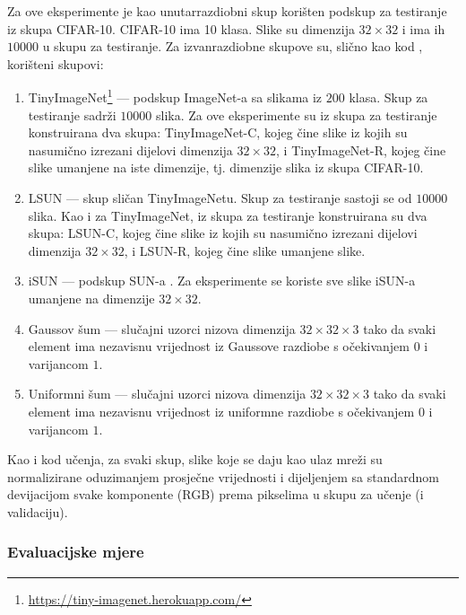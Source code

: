 \documentclass[utf8, diplomski, lmodern]{fer}
\begin{document}
Za ove eksperimente je kao unutarrazdiobni skup korišten podskup za testiranje iz skupa CIFAR-10. CIFAR-10 ima 10 klasa. Slike su dimenzija $32\times 32$ i ima ih $10000$ u skupu za testiranje. Za izvanrazdiobne skupove su, slično kao kod \cite{Hendrycks:2016:BDMOODE,Liang:2017:PDOODENN}, korišteni skupovi:
\begin{enumerate}[topsep=0pt,itemsep=0pt,partopsep=0pt]
	\item TinyImageNet\footnote{\url{https://tiny-imagenet.herokuapp.com/}} --- podskup ImageNet-a \citep{Deng:2009:ILSHID} sa slikama iz $200$ klasa. Skup za testiranje sadrži $10000$ slika. Za ove eksperimente su iz skupa za testiranje konstruirana dva skupa: TinyImageNet-C, kojeg čine slike iz kojih su nasumično izrezani dijelovi dimenzija $32\times 32$, i TinyImageNet-R, kojeg čine slike umanjene na iste dimenzije, tj. dimenzije slika iz skupa CIFAR-10.
	\item LSUN \citep{Yu:2015:LSUN} --- skup sličan TinyImageNetu. Skup za testiranje sastoji se od $10000$ slika. Kao i za TinyImageNet, iz skupa za testiranje konstruirana su dva skupa: LSUN-C, kojeg čine slike iz kojih su nasumično izrezani dijelovi dimenzija $32\times 32$, i LSUN-R, kojeg čine slike umanjene slike.
	\item iSUN \citep{Xu:2015:TCSWBET} --- podskup SUN-a \citep{Xiao:2016:SUN}. Za eksperimente se koriste sve slike iSUN-a umanjene na dimenzije $32\times 32$.
	\item Gaussov šum --- slučajni uzorci nizova dimenzija $32\times 32\times 3$ tako da svaki element ima nezavisnu vrijednost iz Gaussove razdiobe s očekivanjem $0$ i varijancom $1$.
	\item Uniformni šum --- slučajni uzorci nizova dimenzija $32\times 32\times 3$ tako da svaki element ima nezavisnu vrijednost iz uniformne razdiobe s očekivanjem $0$ i varijancom $1$.
\end{enumerate}
Kao i kod učenja, za svaki skup, slike koje se daju kao ulaz mreži su normalizirane oduzimanjem prosječne vrijednosti i dijeljenjem sa standardnom devijacijom svake komponente (RGB) prema pikselima u skupu za učenje (i validaciju).

\subsubsection{Evaluacijske mjere}
\end{document}
